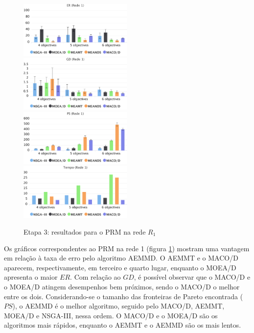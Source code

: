 \begin{figure}[!htbp]
	\caption{Etapa 3: resultados para o PRM na rede $R_1$}
	\label{fig_exp3_prm_r1}
	\includegraphics[width=0.5\textwidth]{cap_experimentos/figs/etapa3/er-mrp-r1}
	\includegraphics[width=0.5\textwidth]{cap_experimentos/figs/etapa3/gd-mrp-r1}
	\includegraphics[width=0.5\textwidth]{cap_experimentos/figs/etapa3/ps-mrp-r1}
	\includegraphics[width=0.5\textwidth]{cap_experimentos/figs/etapa3/time-mrp-r1}
\end{figure}

Os gráficos correspondentes ao PRM na rede 1 (figura \ref{fig_exp3_prm_r1}) mostram uma vantagem em relação à taxa de erro pelo algoritmo AEMMD. O AEMMT e o MACO/D aparecem, respectivamente, em terceiro e quarto lugar, enquanto o MOEA/D apresenta o maior $ER$. Com relação ao $GD$, é possível observar que o MACO/D e o MOEA/D atingem desempenhos bem próximos, sendo o MACO/D o melhor entre os dois. Considerando-se o tamanho das fronteiras de Pareto encontrada ($PS$), o AEMMD é o melhor algoritmo, seguido pelo MACO/D, AEMMT, MOEA/D e NSGA-III, nessa ordem. O MACO/D e o MOEA/D são os algoritmos mais rápidos, enquanto o AEMMT e o AEMMD são os mais lentos.

